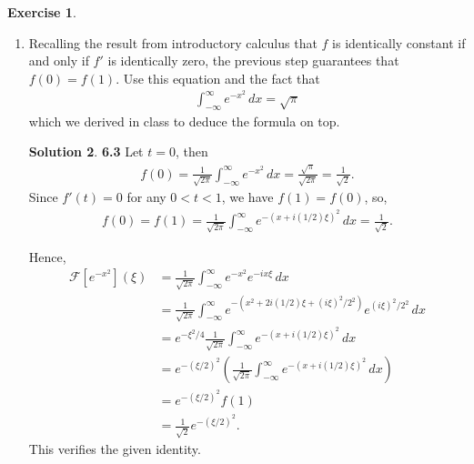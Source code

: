 \documentclass{article}
\theoremstyle{definition}
\newtheorem*{exer*}{Exercise}
\newtheorem*{sln*}{Solution}
\newcommand{\F}{\mathcal{F}}
\newcommand{\f}[2]{\frac{#1}{#2}}
\newcommand{\lp}{\left(}
\newcommand{\rp}{\right)}
\begin{document}
\begin{exer*}
\begin{enumerate}
		\begin{sln*}\textbf{6.2} By change of variables: $y = x + i(t/2)\xi$, we have $dy = dx$, so:
			\begin{align*}
			\f{1}{\sqrt{2\pi}} \int^\infty_{-\infty} -i\xi (x + i(t/2)\xi)e^{-(x + i(t/2)\xi)^2}\,dx = -\f{i\xi}{\sqrt{2\pi}} \int^\infty_{-\infty} y e^{-y^2}\,dy.
			\end{align*}
			Since $y$ is an odd function, $e^{-y^2}$ is an even function, and that the domain of integration is symmetric, $f'(t) = 0$.
			
		\end{sln*}
	
	
	
		\item Recalling the result from introductory calculus that $f$ is identically constant if and only if $f'$ is identically zero, the previous step guarantees that $f(0) = f(1)$. Use this equation and the fact that 
		\begin{align*}
		\int^\infty_{-\infty} e^{-x^2}\,dx = \sqrt{\pi}
		\end{align*}
		which we derived in class to deduce the formula on top.
		
		\begin{sln*}\textbf{6.3} Let $t = 0$, then 
			\begin{align*}
			f(0) = \f{1}{\sqrt{2\pi}} \int^\infty_{-\infty} e^{-x^2}\,dx = \f{\sqrt{\pi}}{\sqrt{2\pi}} = \f{1}{\sqrt{2}}.
			\end{align*}
			Since $f'(t) = 0$ for any $0 < t < 1$, we have $f(1) = f(0)$, so,
			\begin{align*}
			f(0) = f(1) = \f{1}{\sqrt{2\pi}} \int^\infty_{-\infty} e^{-(x+ i(1/2)\xi)^2}\,dx = \f{1}{\sqrt{2}}.
			\end{align*}
			
			Hence,
			\begin{align*}
			\F[e^{-x^2}](\xi) &= \f{1}{\sqrt{2\pi}}\int^{\infty}_{-\infty} e^{-x^2} e^{-ix\xi}\,dx\\
			&=  \f{1}{\sqrt{2\pi}}\int^{\infty}_{-\infty} e^{-(x^2 + 2i(1/2)\xi + (i\xi)^2/2^2 )} e^{(i\xi)^2/2^2}\,dx\\
			&= e^{-\xi^2/4}\f{1}{\sqrt{2\pi}}\int^{\infty}_{-\infty} e^{-(x + i(1/2)\xi )^2} \,dx\\
			&= e^{-(\xi/2)^2} \lp \f{1}{\sqrt{2\pi}}\int^{\infty}_{-\infty} e^{-(x + i(1/2)\xi )^2} \,dx  \rp\\
			&= e^{-(\xi/2)^2} f(1)\\
			&= \f{1}{\sqrt{2}}e^{-(\xi/2)^2}.
			\end{align*}
			This verifies the given identity. 
			
		\end{sln*}
	\end{enumerate}

\end{exer*}
\end{document}
